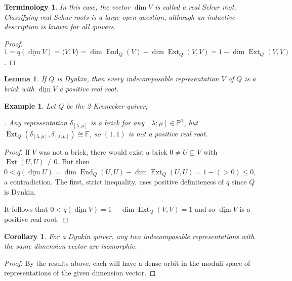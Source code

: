 \documentclass{book}
\newtheorem{lemma}[theorem]{Lemma}
\newtheorem{corollary}[theorem]{Corollary}
\newtheorem{example}{Example}[section]
\newtheorem{terminology}[theorem]{Terminology}
\newcommand{\defterm}{\emph}
\DeclareMathOperator{\End}{End}
\DeclareMathOperator{\Ext}{Ext}
\begin{document}
\begin{terminology}
In this case, the vector $\underline\dim V$ is called a \defterm{real Schur root}. Classifying real Schur roots is a large open question, although an inductive description is known for all quivers.
\end{terminology} 

\begin{proof}
$1 = q(\underline \dim V) = \langle V, V\rangle = \dim \End_Q(V) - \dim \Ext_Q(V,V) = 1 - \dim \Ext_Q(V,V)$.
\end{proof} 

\begin{lemma}\label{lem:dynkin-brick-root}
 If $Q$ is Dynkin, then every indecomposable representation $V$ of $Q$ is a brick with $\underline \dim V$ a positive real root.
\end{lemma}

\begin{example}
Let $Q$ be the 2-Kronecker quiver,
. Any representation $\delta_{[\lambda,\mu]}$ is a brick for any $[\lambda : \mu ] \in \mathbb P^1$, but $\Ext_Q(\delta_{[\lambda,\mu]}, \delta_{[\lambda,\mu]}) \cong \mathbb{F}$, so $(1,1)$ is \emph{not} a positive real root.
\end{example} 

\begin{proof}
If $V$ was not a brick, there would exist a brick $0 \neq U \subsetneq V$ with $\Ext(U,U) \neq 0$. But then $0 < q(\underline \dim U) = \dim \End_Q(U,U) - \dim \Ext_Q(U,U) = 1 - (>0) \leq 0$, a contradiction. The first, strict inequality, uses positive definiteness of $q$ since $Q$ is Dynkin.

It follows that $0 < q(\underline \dim V) = 1 - \dim \Ext_Q(V,V) = 1$ and so $\underline \dim V$ is a positive real root.
\end{proof}

\begin{corollary}\label{cor:dynkin-ind-dim}
For a Dynkin quiver, any two indecomposable representations with the same dimension vector are isomorphic.
\end{corollary}

\begin{proof}
By the results above, each will have a dense orbit in the moduli space of representations of the given dimension vector.
\end{proof}
\end{document}
